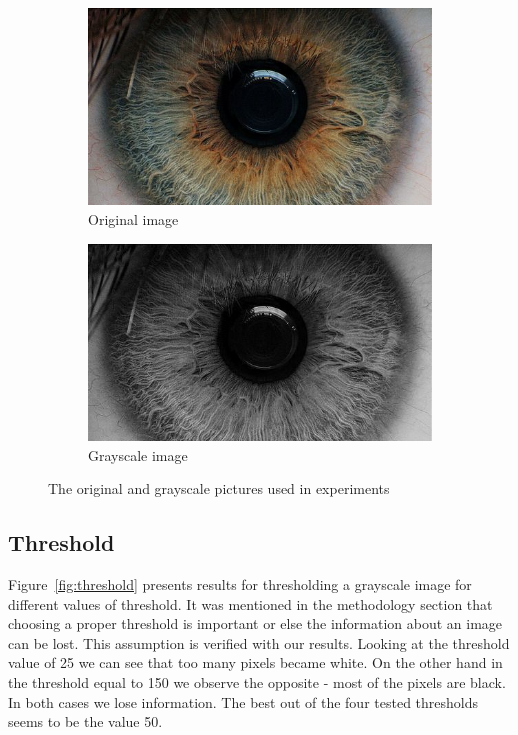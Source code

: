 \documentclass{article}
\begin{document}
\begin{figure}[H]
\centering

\begin{subfigure}{.5\textwidth}
  \centering
  \includegraphics[width=0.9\linewidth]{res/index.jpg}
  \caption{Original image}
  \label{fig:original_img}
\end{subfigure}%
\begin{subfigure}{.5\textwidth}
  \centering
  \includegraphics[width=0.9\linewidth]{res/grayscale.jpg}
  \caption{Grayscale image}
  \label{fig:gray_img}
\end{subfigure}

\caption{The original and grayscale pictures used in experiments}
\label{fig:source_img}
\end{figure}






\subsection{Threshold}
Figure~\ref{fig:threshold} presents results for thresholding a grayscale image for different values of threshold. It was mentioned in the methodology section that choosing a proper threshold is important or else the information about an image can be lost. This assumption is verified with our results. Looking at the threshold value of 25 we can see that too many pixels became white. On the other hand in the threshold equal to 150 we observe the opposite - most of the pixels are black. In both cases we lose information. The best out of the four tested thresholds seems to be the value 50.
\end{document}
